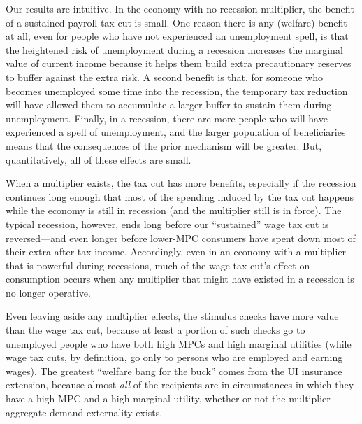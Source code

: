 \documentclass[\econtexRoot/HAFiscal]{subfiles}
\begin{document}
Our results are intuitive. In the economy with no recession multiplier, the benefit of a sustained payroll tax cut is small.  One reason there is any (welfare) benefit at all, even for people who have not experienced an unemployment spell, is that the heightened risk of unemployment during a recession increases the marginal value of current income because it helps them build extra precautionary reserves to buffer against the extra risk.  A second benefit is that, for someone who becomes unemployed some time into the recession, the temporary tax reduction will have allowed them to accumulate a larger buffer to sustain them during unemployment.  Finally, in a recession, there are more people who will have experienced a spell of unemployment, and the larger population of beneficiaries means that the consequences of the prior mechanism will be greater.  But, quantitatively, all of these effects are small.

When a multiplier exists, the tax cut has more benefits, especially if the recession continues long enough that most of the spending induced by the tax cut happens while the economy is still in recession (and the multiplier still is in force).  The typical recession, however, ends long before our ``sustained'' wage tax cut is reversed---and even longer before lower-MPC consumers have spent down most of their extra after-tax income. Accordingly, even in an economy with a multiplier that is powerful during recessions, much of the wage tax cut's effect on consumption occurs when any multiplier that might have existed in a recession is no longer operative.

Even leaving aside any multiplier effects, the stimulus checks have more value than the wage tax cut, because at least a portion of such checks go to unemployed people who have both high MPCs and high marginal utilities (while wage tax cuts, by definition, go only to persons who are employed and earning wages). The greatest ``welfare bang for the buck'' comes from the UI insurance extension, because almost \textit{all} of the recipients are in circumstances in which they have a high MPC and a high marginal utility, whether or not the multiplier aggregate demand externality exists.
\end{document}
